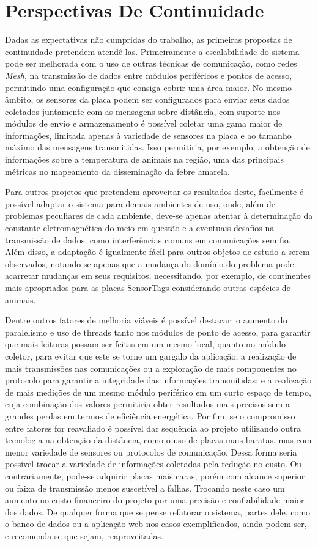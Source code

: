 \section{Perspectivas De Continuidade}

Dadas as expectativas não cumpridas do trabalho, as primeiras propostas de continuidade pretendem atendê-las. Primeiramente a escalabilidade do sistema pode ser melhorada com o uso de outras técnicas de comunicação, como redes \emph{Mesh}, na transmissão de dados entre módulos periféricos e pontos de acesso, permitindo uma configuração que consiga cobrir uma área maior. No mesmo âmbito, os sensores da placa podem ser configurados para enviar seus dados coletados juntamente com as mensagens sobre distância, com suporte nos módulos de envio e armazenamento é possível coletar uma gama maior de informações, limitada apenas à variedade de sensores na placa e ao tamanho máximo das mensagens transmitidas. Isso permitiria, por exemplo, a obtenção de informações sobre a temperatura de animais na região, uma das principais métricas no mapeamento da disseminação da febre amarela.

Para outros projetos que pretendem aproveitar os resultados deste, facilmente é possível adaptar o sistema para demais ambientes de uso, onde, além de problemas peculiares de cada ambiente, deve-se apenas atentar à determinação da constante eletromagnética do meio em questão e a eventuais desafios na transmissão de dados, como interferências comuns em comunicações sem fio. Além disso, a adaptação é igualmente fácil para outros objetos de estudo a serem observados, notando-se apenas que a mudança do domínio do problema pode acarretar mudanças em seus requisitos, necessitando, por exemplo, de continentes mais apropriados para as placas SensorTags considerando outras espécies de animais.

Dentre outros fatores de melhoria viáveis é possível destacar: o aumento do paralelismo e uso de threads tanto nos módulos de ponto de acesso, para garantir que mais leituras possam ser feitas em um mesmo local, quanto no módulo coletor, para evitar que este se torne um gargalo da aplicação; a realização de mais transmissões nas comunicações ou a exploração de mais componentes no protocolo para garantir a integridade das informações transmitidas; e a realização de mais medições de um mesmo módulo periférico em um curto espaço de tempo, cuja combinação dos valores permitiria obter resultados mais precisos sem a grandes perdas em termos de eficiência energética.
Por fim, se o compromisso entre fatores for reavaliado é possível dar sequência ao projeto utilizando outra tecnologia na obtenção da distância, como o uso de placas mais baratas, mas com menor variedade de sensores ou protocolos de comunicação. Dessa forma seria possível trocar a variedade de informações coletadas pela redução no custo. Ou contrariamente, pode-se adquirir placas mais caras, porém com alcance superior ou faixa de transmissão menos suscetível a falhas. Trocando neste caso um aumento no custo financeiro do projeto por uma precisão e confiabilidade maior dos dados. De qualquer forma que se pense refatorar o sistema, partes dele, como o banco de dados ou a aplicação web nos casos exemplificados, ainda podem ser, e recomenda-se que sejam, reaproveitadas.
